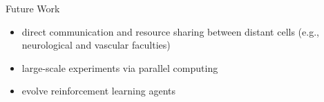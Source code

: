 \begin{block}{Future Work}
\vspace{-1ex}
{\small
\begin{itemize}
\item direct communication and resource sharing between distant cells (e.g., neurological and vascular faculties)
\item large-scale experiments via parallel computing
\item evolve reinforcement learning agents
\end{itemize}
}
\vspace{-1ex}
\end{block}
